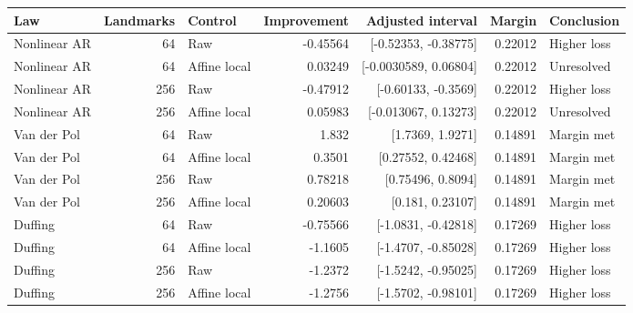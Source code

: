 \begin{tabular}{lrlrrrl}
\toprule
Law & Landmarks & Control & Improvement & Adjusted interval & Margin & Conclusion \\
\midrule
Nonlinear AR & 64 & Raw & -0.45564 & [-0.52353, -0.38775] & 0.22012 & Higher loss \\
Nonlinear AR & 64 & Affine local & 0.03249 & [-0.0030589, 0.06804] & 0.22012 & Unresolved \\
Nonlinear AR & 256 & Raw & -0.47912 & [-0.60133, -0.3569] & 0.22012 & Higher loss \\
Nonlinear AR & 256 & Affine local & 0.05983 & [-0.013067, 0.13273] & 0.22012 & Unresolved \\
Van der Pol & 64 & Raw & 1.832 & [1.7369, 1.9271] & 0.14891 & Margin met \\
Van der Pol & 64 & Affine local & 0.3501 & [0.27552, 0.42468] & 0.14891 & Margin met \\
Van der Pol & 256 & Raw & 0.78218 & [0.75496, 0.8094] & 0.14891 & Margin met \\
Van der Pol & 256 & Affine local & 0.20603 & [0.181, 0.23107] & 0.14891 & Margin met \\
Duffing & 64 & Raw & -0.75566 & [-1.0831, -0.42818] & 0.17269 & Higher loss \\
Duffing & 64 & Affine local & -1.1605 & [-1.4707, -0.85028] & 0.17269 & Higher loss \\
Duffing & 256 & Raw & -1.2372 & [-1.5242, -0.95025] & 0.17269 & Higher loss \\
Duffing & 256 & Affine local & -1.2756 & [-1.5702, -0.98101] & 0.17269 & Higher loss \\
\bottomrule
\end{tabular}

